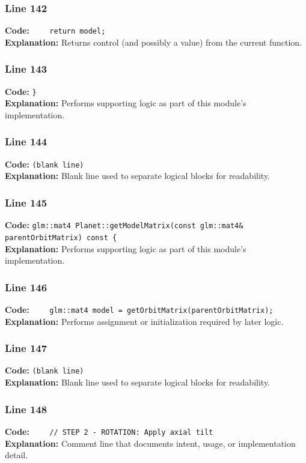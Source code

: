 \documentclass[11pt,a4paper]{article}
\begin{document}
\subsubsection*{Line 142}
\textbf{Code:} \verb|    return model;|\\
\textbf{Explanation:} Returns control (and possibly a value) from the current function.

\subsubsection*{Line 143}
\textbf{Code:} \verb|}|\\
\textbf{Explanation:} Performs supporting logic as part of this module's implementation.

\subsubsection*{Line 144}
\textbf{Code:} \texttt{(blank line)}\\
\textbf{Explanation:} Blank line used to separate logical blocks for readability.

\subsubsection*{Line 145}
\textbf{Code:} \verb|glm::mat4 Planet::getModelMatrix(const glm::mat4& parentOrbitMatrix) const {|\\
\textbf{Explanation:} Performs supporting logic as part of this module's implementation.

\subsubsection*{Line 146}
\textbf{Code:} \verb|    glm::mat4 model = getOrbitMatrix(parentOrbitMatrix);|\\
\textbf{Explanation:} Performs assignment or initialization required by later logic.

\subsubsection*{Line 147}
\textbf{Code:} \texttt{(blank line)}\\
\textbf{Explanation:} Blank line used to separate logical blocks for readability.

\subsubsection*{Line 148}
\textbf{Code:} \verb|    // STEP 2 - ROTATION: Apply axial tilt|\\
\textbf{Explanation:} Comment line that documents intent, usage, or implementation detail.
\end{document}
